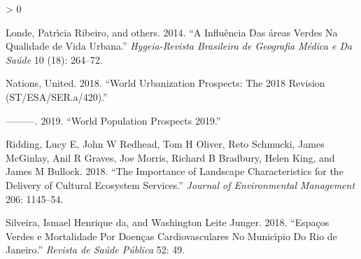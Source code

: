 \documentclass[
]{article}
\newlength{\cslhangindent}
\newenvironment{CSLReferences}[2] %
 {%
  \setlength{\parindent}{0pt}
  \ifodd #1 \everypar{\setlength{\hangindent}{\cslhangindent}}\ignorespaces\fi
  \ifnum #2 > 0
  \setlength{\parskip}{#2\baselineskip}
  \fi
 }%
 {}
\begin{document}
\begin{CSLReferences}{1}{0}
\leavevmode\hypertarget{ref-londe2014influencia}{}%
Londe, Patrı́cia Ribeiro, and others. 2014. {``A Influ{ê}ncia Das {á}reas
Verdes Na Qualidade de Vida Urbana.''} \emph{Hygeia-Revista Brasileira
de Geografia M{é}dica e Da Sa{ú}de} 10 (18): 264--72.

\leavevmode\hypertarget{ref-un2018}{}%
Nations, United. 2018. {``World Urbanization Prospects: The 2018
Revision (ST/ESA/SER.a/420).''}

\leavevmode\hypertarget{ref-un2019}{}%
---------. 2019. {``World Population Prospects 2019.''}

\leavevmode\hypertarget{ref-ridding2018importance}{}%
Ridding, Lucy E, John W Redhead, Tom H Oliver, Reto Schmucki, James
McGinlay, Anil R Graves, Joe Morris, Richard B Bradbury, Helen King, and
James M Bullock. 2018. {``The Importance of Landscape Characteristics
for the Delivery of Cultural Ecosystem Services.''} \emph{Journal of
Environmental Management} 206: 1145--54.

\leavevmode\hypertarget{ref-silveira2018espaccos}{}%
Silveira, Ismael Henrique da, and Washington Leite Junger. 2018.
{``Espa{ç}os Verdes e Mortalidade Por Doen{ç}as Cardiovasculares No
Munic{ı́}pio Do Rio de Janeiro.''} \emph{Revista de Sa{ú}de P{ú}blica}
52: 49.

\end{CSLReferences}
\end{document}
